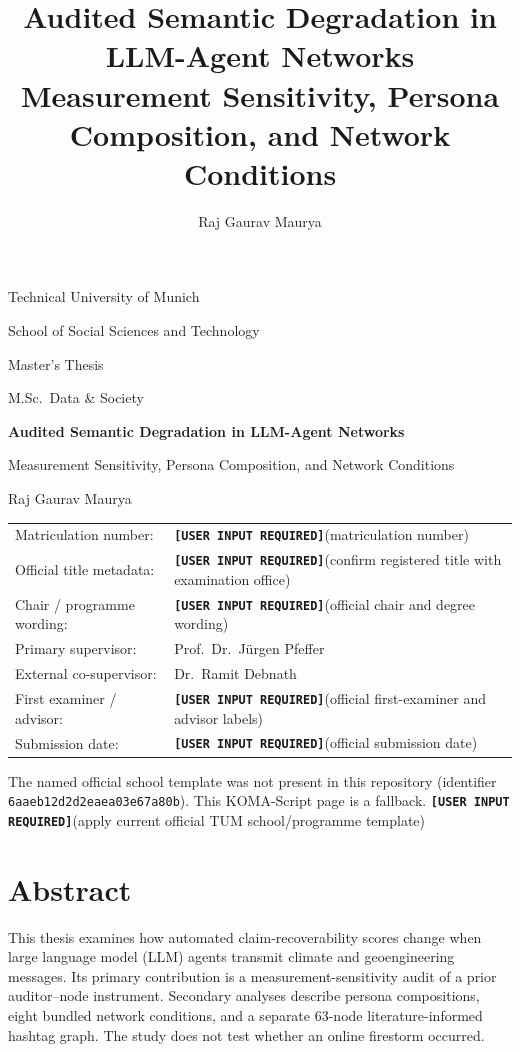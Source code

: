 \documentclass[
  11pt,a4paper,twoside,openright,
  bibliography=totoc,listof=totoc,
  captions=tableheading,headings=normal,numbers=noenddot
]{scrbook}
\title{Audited Semantic Degradation in LLM-Agent Networks\\
Measurement Sensitivity, Persona Composition, and Network Conditions}
\author{Raj Gaurav Maurya}
\date{\UserInput{official submission date}}
\newcommand{\UserInput}[1]{%
  \textbf{\texttt{[USER INPUT REQUIRED]}}\space(#1)}
\begin{document}
\frontmatter

\begin{titlepage}
\centering
{\Large Technical University of Munich\par}
{\large School of Social Sciences and Technology\par}
\vspace{0.35cm}
{\large Master's Thesis\par}
{\large M.Sc.\ Data \& Society\par}
\vspace{1.6cm}
{\huge\bfseries Audited Semantic Degradation in LLM-Agent Networks\par}
\vspace{0.4cm}
{\Large Measurement Sensitivity, Persona Composition, and Network Conditions\par}
\vspace{0.8cm}
{\large Raj Gaurav Maurya\par}
\vfill
\begin{tabular}{@{}p{}p{}@{}}
Matriculation number: & \UserInput{matriculation number} \\
Official title metadata: & \UserInput{confirm registered title with examination office} \\
Chair / programme wording: & \UserInput{official chair and degree wording} \\
Primary supervisor: & Prof.\ Dr.\ J\"urgen Pfeffer \\
External co-supervisor: & Dr.\ Ramit Debnath \\
First examiner / advisor: & \UserInput{official first-examiner and advisor labels} \\
Submission date: & \UserInput{official submission date} \\
\end{tabular}
\vfill
{\small The named official school template was not present in this repository
(identifier \texttt{6aaeb12d2d2eaea03e67a80b}).
This KOMA-Script page is a fallback.
\UserInput{apply current official TUM school/programme template}\par}
\end{titlepage}

\chapter*{Abstract}
This thesis examines how automated claim-recoverability scores change when
large language model (LLM) agents transmit climate and geoengineering
messages. Its primary contribution is a measurement-sensitivity audit of a
prior auditor--node instrument. Secondary analyses describe persona
compositions, eight bundled network conditions, and a separate 63-node
literature-informed hashtag graph. The study does not test whether an online
firestorm occurred.
\end{document}
